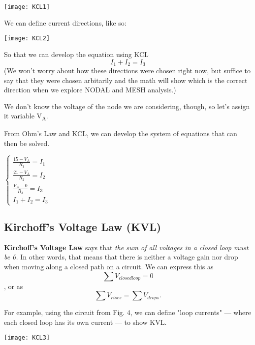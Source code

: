\documentclass[12pt,letterpaper]{article}
\begin{document}
\begin{center}
\texttt{[image: KCL1]} \label{Fig. 4}
\end{center}

We can define current directions, like so:

\begin{center}
\texttt{[image: KCL2]} \label{Fig. 5}
\end{center}

So that we can develop the equation using KCL \begin{equation} I_{1} + I_{2} = I_{3} \end{equation} (We won't worry about how these directions were chosen right now, but suffice to say that they were chosen arbitarily and the math will show which is the correct direction when we explore NODAL and MESH analysis.) \par

We don't know the voltage of the node we are considering, though, so let's assign it variable V\textsubscript{A}. \par

From Ohm's Law and KCL, we can develop the system of equations that can then be solved.

$\begin{cases}
\frac{15 - V_{A}}{R_{1}} = I_{1} \\
\frac{21 - V_{A}}{R_{2}} = I_{2} \\
\frac{V_A - 0}{R_{3}} = I_{3} \\
I_1 + I_2 = I_3
\end{cases}$

\subsection{Kirchoff's Voltage Law (KVL)}
\textbf{Kirchoff's Voltage Law} says that \textit{the sum of all voltages in a closed loop must be 0.} In other words, that means that there is neither a voltage gain nor drop when moving along a closed path on a circuit. We can express this as \begin{equation} \sum V_{closed loop} = 0 \end{equation}, or as \begin{equation} \sum V_{rises} = \sum V_{drops}. \end{equation} \par

For example, using the circuit from Fig. 4, we can define "loop currents" --- where each closed loop has its own current --- to show KVL.
\begin{center}
\texttt{[image: KCL3]} \label{Fig. 6}
\end{center}
\end{document}
